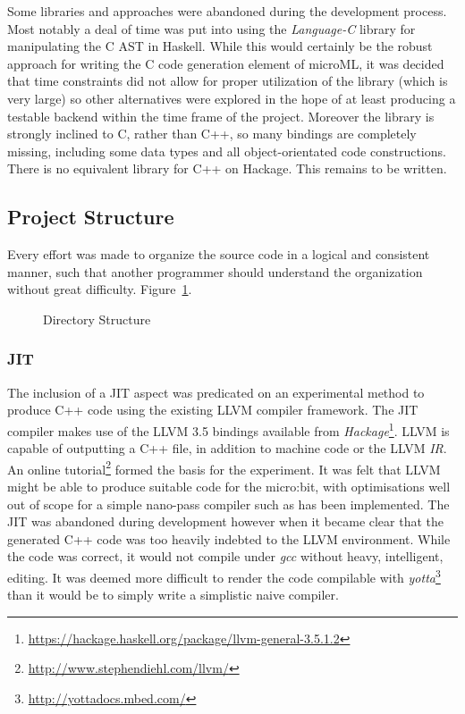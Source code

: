 \documentclass[12pt, a4paper]{report}
\begin{document}
Some libraries and approaches were abandoned during the development process. Most notably a deal of
time was put into using the \textit{Language-C} library for manipulating the C AST in Haskell. While
this would certainly be the robust approach for writing the C code generation element of microML,
it was decided that time constraints did not allow for proper utilization of the library (which is
very large) so other alternatives were explored in the hope of at least producing a testable backend
within the time frame of the project. Moreover the library is strongly inclined to C, rather than
C++, so many bindings are completely missing, including some data types and all object-orientated
code constructions. There is no equivalent library for C++ on Hackage. This remains to be written. 

\subsection{Project Structure}
Every effort was made to organize the source code in a logical and consistent manner, such that
another programmer should understand the organization without great difficulty.
Figure~\ref{fig:dir}.

\begin{figure}
\caption{Directory Structure}
\label{fig:dir}
\end{figure}

\subsubsection{JIT}\label{JIT}
The inclusion of a JIT aspect was predicated on an experimental method to produce C++ code using
the existing LLVM compiler framework. The JIT compiler makes use of the LLVM 3.5 bindings available
from \textit{Hackage}\footnote{\url{https://hackage.haskell.org/package/llvm-general-3.5.1.2}}.
LLVM is capable of outputting a C++ file, in addition to machine code or the LLVM \textit{IR}.
An online tutorial\footnote{\url{http://www.stephendiehl.com/llvm/}} formed the basis for the
experiment. It was felt that LLVM might be able to produce suitable code for the micro:bit, with
optimisations well out of scope for a simple nano-pass compiler such as has been implemented. The
JIT was abandoned during development however when it became clear that the generated C++ code was
too heavily indebted to the LLVM environment. While the code was correct, it would not compile under
\textit{gcc} without heavy, intelligent, editing. It was deemed more difficult to render the code compilable
with \textit{yotta}\footnote{\url{http://yottadocs.mbed.com/}} than it would be to simply write a
simplistic naive compiler.
\end{document}
